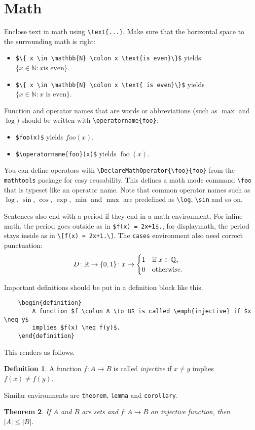 \documentclass[a4paper,11pt,DIV=15]{scrartcl} %
\theoremstyle{plain}
\newtheorem{theorem}{Theorem}
\theoremstyle{definition}
\newtheorem{definition}[theorem]{Definition}
\begin{document}
\section{Math}\label{s:math}
Enclose text in math using \verb|\text{...}|. Make sure that the horizontal
space to the surrounding math is right:
\begin{itemize}
	\item \verb|$\{ x \in \mathbb{N} \colon x \text{is even}\}$| yields
		$\{ x \in \mathbb{N} \colon x \text{is even}\}$.
	\item \verb|$\{ x \in \mathbb{N} \colon x \text{ is even}\}$| yields
		$\{ x \in \mathbb{N} \colon x \text{ is even}\}$.
\end{itemize}
Function and operator names that are words or abbreviations (such as $\max$ and
$\log$) should be written with \verb|\operatorname{foo}|:
\begin{itemize}
	\item \verb|$foo(x)$| yields $foo(x)$.
	\item \verb|$\operatorname{foo}(x)$| yields 
		$\operatorname{foo}(x)$.
\end{itemize}
You can define operators with
\verb|\DeclareMathOperator{\foo}{foo}| from the \verb|mathtools|
package for easy reusability. This defines a math mode command
\verb|\foo| that is typeset like an operator name. Note that common
operator names such as $\log$, $\sin$, $\cos$, $\exp$, $\min$ and $\max$ are
predefined as \verb|\log|, \verb|\sin| and so on.\par

Sentences also end with a period if they end in a math environment. For inline
math, the period goes outside as in \verb|$f(x) = 2x+1$.|, for displaymath, the 
period stays inside as in \verb|\[f(x) = 2x+1.\]|. The \verb|cases| environment
also need correct punctuation:
\[
	D \colon \mathbb{R} \to \{0, 1\} \colon x \mapsto
	\begin{cases}
		1	& \text{if }x \in \mathbb{Q}\text,\\
		0	& \text{otherwise.}
	\end{cases}
\]

Important definitions should be put in a definition block like this.
\begin{verbatim}
	\begin{definition}
		A function $f \colon A \to B$ is called \emph{injective} if $x \neq y$
		implies $f(x) \neq f(y)$.
	\end{definition}
\end{verbatim}
This renders as follows.
\begin{definition}
	A function $f \colon A \to B$ is called \emph{injective} if $x \neq y$
	implies $f(x) \neq f(y)$.
\end{definition}
Similar environments are \verb|theorem|, \verb|lemma| and \verb|corollary|.
\begin{theorem}
	If $A$ and $B$ are sets and $f \colon A \to B$ an injective function, then
	$\lvert A \rvert \leq \lvert B \rvert$.
\end{theorem}
\end{document}
